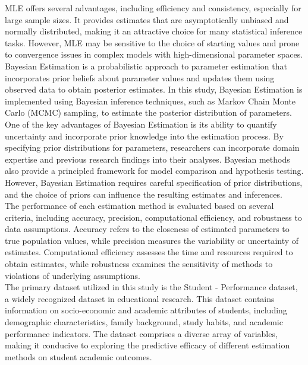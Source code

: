 \documentclass[12pt]{article}
\begin{document}
	MLE offers several advantages, including efficiency and consistency, especially for large sample sizes. It provides estimates that are asymptotically unbiased and normally distributed, making it an attractive choice for many statistical inference tasks. However, MLE may be sensitive to the choice of starting values and prone to convergence issues in complex models with high-dimensional parameter spaces.
	\\
	
	Bayesian Estimation is a probabilistic approach to parameter estimation that incorporates prior beliefs about parameter values and updates them using observed data to obtain posterior estimates. In this study, Bayesian Estimation is implemented using Bayesian inference techniques, such as Markov Chain Monte Carlo (MCMC) sampling, to estimate the posterior distribution of parameters.
	\\
	
	One of the key advantages of Bayesian Estimation is its ability to quantify uncertainty and incorporate prior knowledge into the estimation process. By specifying prior distributions for parameters, researchers can incorporate domain expertise and previous research findings into their analyses. Bayesian methods also provide a principled framework for model comparison and hypothesis testing. However, Bayesian Estimation requires careful specification of prior distributions, and the choice of priors can influence the resulting estimates and inferences.
	\\
	
	The performance of each estimation method is evaluated based on several criteria, including accuracy, precision, computational efficiency, and robustness to data assumptions. Accuracy refers to the closeness of estimated parameters to true population values, while precision measures the variability or uncertainty of estimates. Computational efficiency assesses the time and resources required to obtain estimates, while robustness examines the sensitivity of methods to violations of underlying assumptions.
	\\
	
	The primary dataset utilized in this study is the Student - Performance dataset, a widely recognized dataset in educational research. This dataset contains information on socio-economic and academic attributes of students, including demographic characteristics, family background, study habits, and academic performance indicators. The dataset comprises a diverse array of variables, making it conducive to exploring the predictive efficacy of different estimation methods on student academic outcomes.
	\\
	
\end{document}
